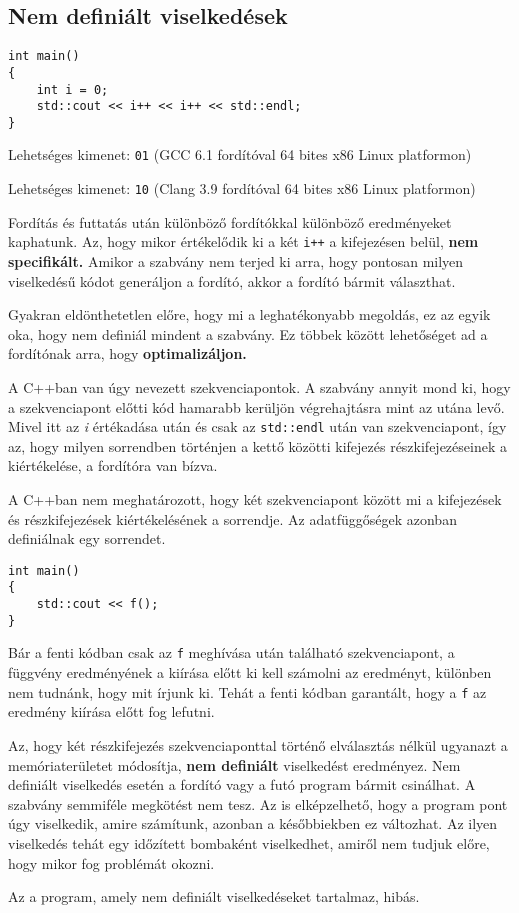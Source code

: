\documentclass[../cpp_book/cpp_book.tex]{subfiles}
\begin{document}
	\subsection{Nem definiált viselkedések}
	\begin{lstlisting}
int main()
{
	int i = 0;
	std::cout << i++ << i++ << std::endl;
}
	\end{lstlisting}
	Lehetséges kimenet: \texttt{01} (GCC 6.1 fordítóval 64 bites x86 Linux platformon)
	
	Lehetséges kimenet: \texttt{10} (Clang 3.9 fordítóval 64 bites x86 Linux platformon)
	\medskip
	
	Fordítás és futtatás után különböző fordítókkal különböző eredményeket kaphatunk. Az, hogy mikor értékelődik ki a két \texttt{i++} a kifejezésen belül, \textbf{nem specifikált.} Amikor a szabvány nem terjed ki arra, hogy pontosan milyen viselkedésű kódot generáljon a fordító, akkor a fordító bármit választhat. 
	\medskip
	
	Gyakran eldönthetetlen előre, hogy mi a leghatékonyabb megoldás, ez az egyik oka, hogy nem definiál mindent a szabvány.
	Ez többek között lehetőséget ad a fordítónak arra, hogy \textbf{optimalizáljon.} 
	\medskip
	
	A C++ban van úgy nevezett szekvenciapontok. A szabvány annyit mond ki, hogy a szekvenciapont előtti kód hamarabb kerüljön végrehajtásra mint az utána levő. Mivel itt az \textit{i} értékadása után és csak az \texttt{std::endl} után van szekvenciapont, így az, hogy milyen sorrendben történjen a kettő közötti kifejezés részkifejezéseinek a kiértékelése, a fordítóra van bízva.
	\medskip
	
	A C++ban nem meghatározott, hogy két szekvenciapont között mi a kifejezések és részkifejezések kiértékelésének a sorrendje. Az adatfüggőségek azonban definiálnak egy sorrendet.

	\begin{lstlisting}
int main()
{
	std::cout << f();
}
	\end{lstlisting}

	Bár a fenti kódban csak az \texttt{f} meghívása után található szekvenciapont, a függvény eredményének a kiírása előtt ki kell számolni az eredményt, különben nem tudnánk, hogy mit írjunk ki. Tehát a fenti kódban garantált, hogy a \texttt{f} az eredmény kiírása előtt fog lefutni.

	\medskip
	Az, hogy két részkifejezés szekvenciaponttal történő elválasztás nélkül ugyanazt a memóriaterületet módosítja, \textbf{nem definiált} viselkedést eredményez. Nem definiált viselkedés esetén a fordító vagy a futó program bármit csinálhat. A szabvány semmiféle megkötést nem tesz. Az is elképzelhető, hogy a program pont úgy viselkedik, amire számítunk, azonban a későbbiekben ez változhat. Az ilyen viselkedés tehát egy időzített bombaként viselkedhet, amiről nem tudjuk előre, hogy mikor fog problémát okozni.
	\begin{note}
		Az a program, amely nem definiált viselkedéseket tartalmaz, hibás.
	\end{note}
\end{document}
